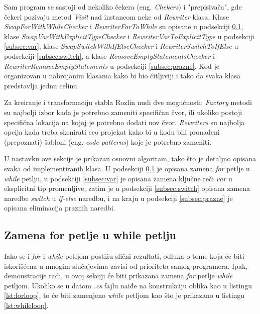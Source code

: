 \documentclass[a4paper]{article}
\begin{document}
{		Sam program se sastoji od nekoliko čekera (eng. \textit{Chekers}) i "prepisivača", gde čekeri pozivaju metod \textit{Visit} nad instancom neke od \textit{Rewriter} klasa. Klase \textit{SwapForWithWhileChecker} i \textit{RewriterForToWhile} su opisane u podsekciji \ref{subsec:for}, klase \textit{SwapVarWithExplicitTypeChecker} i \textit{RewriterVarToExplicitType} u podsekciji \ref{subsec:var}, klase \textit{SwapSwitchWithIfElseChecker} i \textit{RewriterSwitchToIfElse} u podsekciji \ref{subsec:switch}, a klase \textit{RemoveEmptyStatementsChecker} i \textit{RewriterRemoveEmptyStatements} u podsekciji \ref{subsec:prazne}. Kod je organizovan u nabrojanim klasama kako bi bio čitljiviji i tako da svaka klasa predstavlja jednu celinu.
		
		Za kreiranje i transformaciju stabla Rozlin nudi dve mogućnosti: \textit{Factory} metodi su najbolji izbor kada je potrebno zameniti specifičan čvor, ili ukoliko postoji specifična lokacija na kojoj je potrebno dodati nov čvor. \textit{Rewriters} su najbolja opcija kada treba skenirati ceo projekat kako bi u kodu bili pronađeni (prepoznati) šabloni (eng. \textit{code patterns}) koje je potrebno zameniti.
		
		U nastavku ove sekcije je prikazan osnovni algoritam, tako što je detaljno opisana svaka od implementiranih klasa. U podsekciji \ref{subsec:for} je opisana zamena \textit{for} petlje u \textit{while} petlju, u podsekciji \ref{subsec:var} je opisana zamena ključne reči \textit{var} u eksplicitni tip promenljive, zatim je u podsekciji \ref{subsec:switch} opisana zamena naredbe  \textit{switch} u \textit{if-else} naredbu, i na kraju u podsekciji \ref{subsec:prazne} je opisana eliminacija praznih naredbi.
		
		
		\subsection{Zamena for petlje u while petlju}
		\label{subsec:for}
		
		Iako se i \textit{for} i \textit{while} petljom postižu slični rezultati, odluka o tome koja će biti iskorišćena u mnogim slučajevima zavisi od prioriteta samog programera. Ipak, demonstracije radi, u ovoj sekciji će biti prikazana zamena \textit{for} petlje \textit{while} petljom. Ukoliko se u datom \textit{.cs} fajlu naiđe na konstrukciju oblika kao u listingu \ref{lst:forloop}, to će biti zamenjeno \textit{while} petljom kao što je prikazano u listingu \ref{lst:whileloop}.
		
}
\end{document}
